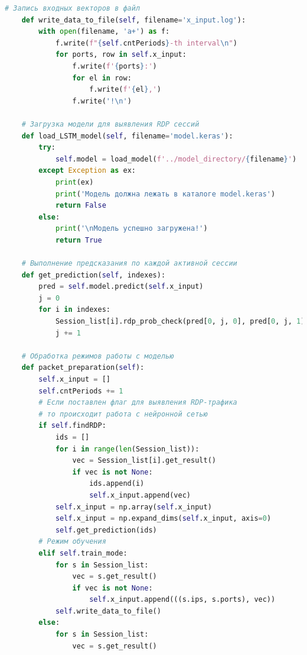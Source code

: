 \documentclass[spec, och, diploma]{SCWorks}
\begin{document}
\begin{lstlisting}[language=Python]
    # Запись входных векторов в файл
    def write_data_to_file(self, filename='x_input.log'):
        with open(filename, 'a+') as f:
            f.write(f"{self.cntPeriods}-th interval\n")
            for ports, row in self.x_input:
                f.write(f'{ports}:')
                for el in row:
                    f.write(f'{el},')
                f.write('!\n')

    # Загрузка модели для выявления RDP сессий
    def load_LSTM_model(self, filename='model.keras'):
        try:
            self.model = load_model(f'../model_directory/{filename}')
        except Exception as ex:
            print(ex)
            print('Модель должна лежать в каталоге model.keras')
            return False
        else:
            print('\nМодель успешно загружена!')
            return True
    
    # Выполнение предсказания по каждой активной сессии
    def get_prediction(self, indexes):
        pred = self.model.predict(self.x_input)
        j = 0
        for i in indexes:
            Session_list[i].rdp_prob_check(pred[0, j, 0], pred[0, j, 1])
            j += 1

    # Обработка режимов работы с моделью
    def packet_preparation(self):
        self.x_input = []
        self.cntPeriods += 1
        # Если поставлен флаг для выявления RDP-трафика
        # то происходит работа с нейронной сетью
        if self.findRDP:
            ids = []
            for i in range(len(Session_list)):
                vec = Session_list[i].get_result()
                if vec is not None:
                    ids.append(i)
                    self.x_input.append(vec)
            self.x_input = np.array(self.x_input)
            self.x_input = np.expand_dims(self.x_input, axis=0)
            self.get_prediction(ids)
        # Режим обучения
        elif self.train_mode:
            for s in Session_list:
                vec = s.get_result()
                if vec is not None:
                    self.x_input.append(((s.ips, s.ports), vec))
            self.write_data_to_file()
        else:
            for s in Session_list:
                vec = s.get_result()


\end{lstlisting}
\end{document}
